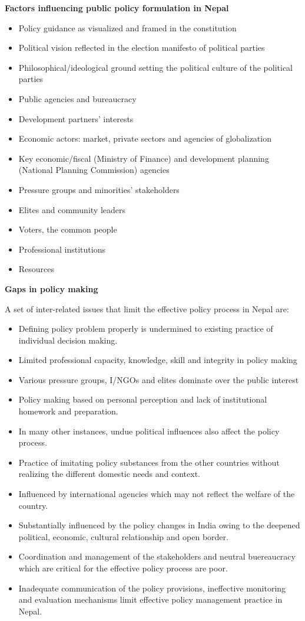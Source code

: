 \documentclass[
  openany]{book}
\providecommand{\tightlist}{%
  \setlength{\itemsep}{0pt}\setlength{\parskip}{0pt}}
\begin{document}
\textbf{Factors influencing public policy formulation in Nepal}

\begin{itemize}
\tightlist
\item
  Policy guidance as visualized and framed in the constitution
\item
  Political vision reflected in the election manifesto of political parties
\item
  Philosophical/ideological ground setting the political culture of the political parties
\item
  Public agencies and bureaucracy
\item
  Development partners' interests
\item
  Economic actors: market, private sectors and agencies of globalization
\item
  Key economic/fiscal (Ministry of Finance) and development planning (National Planning Commission) agencies
\item
  Pressure groups and minorities' stakeholders
\item
  Elites and community leaders
\item
  Voters, the common people
\item
  Professional institutions
\item
  Resources
\end{itemize}

\textbf{Gaps in policy making}

A set of inter-related issues that limit the effective policy process in Nepal are:

\begin{itemize}
\tightlist
\item
  Defining policy problem properly is undermined to existing practice of individual decision making.
\item
  Limited professional capacity, knowledge, skill and integrity in policy making
\item
  Various pressure groups, I/NGOs and elites dominate over the public interest
\item
  Policy making based on personal perception and lack of institutional homework and preparation.
\item
  In many other instances, undue political influences also affect the policy process.
\item
  Practice of imitating policy substances from the other countries without realizing the different domestic needs and context.
\item
  Influenced by international agencies which may not reflect the welfare of the country.
\item
  Substantially influenced by the policy changes in India owing to the deepened political, economic, cultural relationship and open border.
\item
  Coordination and management of the stakeholders and neutral buereaucracy which are critical for the effective policy process are poor.
\item
  Inadequate communication of the policy provisions, ineffective monitoring and evaluation mechanisms limit effective policy management practice in Nepal.
\end{itemize}
\end{document}

